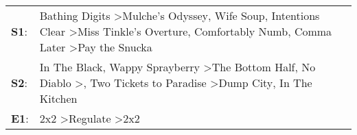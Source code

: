\begin{supertabular}{p{0.03\textwidth}p{0.92\textwidth}}
 \textbf{S1}:  &  Bathing Digits\textsuperscript{} \textgreater \enspace Mulche's Odyssey\textsuperscript{}, \enspace Wife Soup\textsuperscript{}, \enspace Intentions Clear\textsuperscript{} \textgreater \enspace Miss Tinkle's Overture\textsuperscript{}, \enspace Comfortably Numb\textsuperscript{}, \enspace Comma Later\textsuperscript{} \textgreater \enspace Pay the Snucka\textsuperscript{}  \enspace  \\
 \textbf{S2}:  &                  In The Black\textsuperscript{}, \enspace Wappy Sprayberry\textsuperscript{} \textgreater \enspace The Bottom Half\textsuperscript{}, \enspace No Diablo\textsuperscript{} \textgreater {}\textsuperscript{}, \enspace Two Tickets to Paradise\textsuperscript{} \textgreater \enspace Dump City\textsuperscript{}, \enspace In The Kitchen\textsuperscript{}  \enspace  \\
 \textbf{E1}:  &                                                                                                                                                                                                                                                                       2x2\textsuperscript{} \textgreater \enspace Regulate\textsuperscript{} \textgreater \enspace 2x2\textsuperscript{}  \enspace  \\
\end{supertabular}
